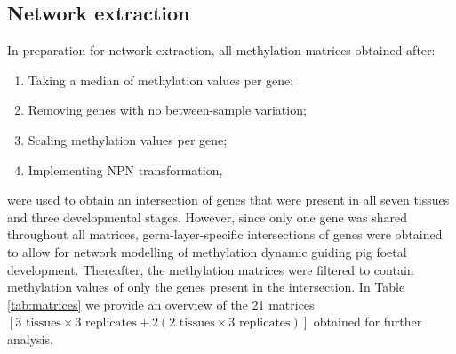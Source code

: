 \documentclass[
	a4paper, %
	10pt, %
	unnumberedsections, %
	twoside, %
]{LTJournalArticle}
\begin{document}
\subsection{\normalsize Network extraction}\label{netextr-meth}
In preparation for network extraction, all methylation matrices obtained after:

\begin{enumerate}
	\item Taking a median of methylation values per gene;
	\item Removing genes with no between-sample variation;
	\item Scaling methylation values per gene;
	\item Implementing NPN transformation,
\end{enumerate}

\noindent were used to obtain an intersection of 
genes that were present in all seven tissues and three 
developmental stages. However, since only one
gene was shared throughout all matrices, germ-layer-specific intersections 
of genes were obtained to allow for network modelling of methylation
dynamic guiding pig foetal development. 
Thereafter, 
the methylation matrices were filtered to contain methylation values of only 
the genes present in the intersection.
In Table \ref{tab:matrices} we provide an overview of the 21 matrices $[3 \text{ tissues} \times 3 \text{ replicates} + 2(2 \text{ tissues} \times 3 \text{ replicates})]$ obtained for further analysis.

\begin{table}[htbp]
	\caption{An overview of the germ layer-specific methylation matrices obtained for downstream analyses}
	\label{tab:matrices}
	\end{table}
\end{document}
